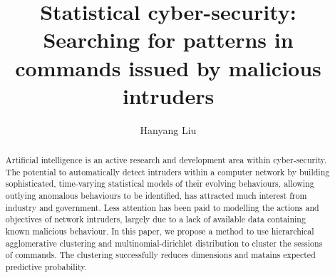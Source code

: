 \documentclass[a4paper, twoside]{report}
\title{Statistical cyber-security: Searching for patterns in commands issued by malicious intruders}
\author{Hanyang Liu}
\begin{document}


\begin{abstract}
    Artificial intelligence is an active research and development area within cyber-security. 
    The potential to automatically detect intruders within a computer network by building sophisticated, 
    time-varying statistical models of their evolving behaviours, 
    allowing outlying anomalous behaviours to be identified, 
    has attracted much interest from industry and government. 
    Less attention has been paid to modelling the actions and objectives of network intruders,
    largely due to a lack of available data containing known malicious behaviour.
    In this paper, we propose a method to use hierarchical agglomerative clustering
    and multinomial-dirichlet distribution to cluster the sessions of commands.
    The clustering successfully reduces dimensions and matains expected predictive probability.
\end{abstract}


\tableofcontents
\listoffigures
\listoftables










\end{document}
